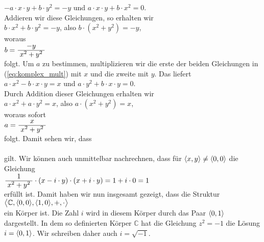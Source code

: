 $-a \cdot x \cdot y + b \cdot y^2 = -y$ \quad und \quad $a \cdot x \cdot y + b \cdot
x^2 = 0$.
\\[0.2cm]
Addieren wir diese Gleichungen, so erhalten wir
\\[0.2cm]
\hspace*{1.3cm} 
$b \cdot x^2 + b \cdot y^2 = -y$, \quad also \quad
$b \cdot (x^2 + y^2) = -y$,
\\[0.2cm]
woraus
\\[0.2cm]
\hspace*{1.3cm} $b = \bruch{-y}{x^2 + y^2}$
\\[0.2cm]
folgt.  Um $a$ zu bestimmen, multiplizieren wir die erste der beiden Gleichungen in
(\ref{eq:komplex_mult}) mit $x$ und die zweite mit $y$.  Das liefert
\\[0.2cm]
\hspace*{1.3cm}
$a \cdot x^2 - b \cdot x \cdot y = x$ \quad und \quad $a \cdot y^2 + b \cdot x \cdot y = 0$.
\\[0.2cm]
Durch Addition dieser Gleichungen erhalten wir
\\[0.2cm]
\hspace*{1.3cm}
$a \cdot x^2 + a \cdot y^2 = x$, \quad also \quad $a \cdot (x^2 + y^2) = x$,
\\[0.2cm]
woraus sofort
\\[0.2cm]
\hspace*{1.3cm}
$a = \bruch{x}{x^2 + y^2}$
\\[0.2cm]
folgt.  Damit sehen wir, dass 
\\[0.2cm]
\hspace*{1.3cm}
\colorbox{red}{}
\\[0.2cm]
gilt.  Wir k\"{o}nnen auch unmittelbar nachrechnen, dass f\"{u}r $\pair(x,y) \not= \pair(0,0)$ die Gleichung
\\[0.2cm]
\hspace*{1.3cm}
$\bruch{1}{x^2 + y^2} \cdot (x  - i \cdot y) \cdot (x + i \cdot y) = 1 + i \cdot 0 = 1$ 
\\[0.2cm]
erf\"{u}llt ist.  Damit haben wir nun insgesamt gezeigt, dass die Struktur
\\[0.2cm]
\hspace*{1.3cm}
$\bigl\langle \mathbb{C}, \pair(0,0), \pair(1,0), +, \cdot \bigr\rangle$ 
\\[0.2cm]
ein K\"{o}rper ist.  Die Zahl $i$ wird in diesem K\"{o}rper durch das Paar $\pair(0,1)$ dargestellt.
In dem so definierten K\"{o}rper $\mathbb{C}$ hat die Gleichung $z^2 = -1$ die L\"{o}sung
$i = \pair(0,1)$.  Wir schreiben daher auch $i = \sqrt{-1}$.

